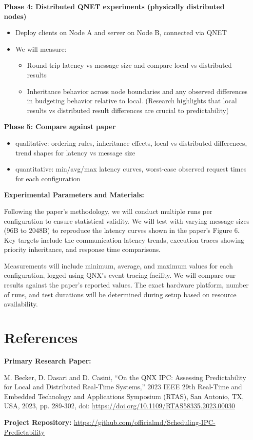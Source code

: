\documentclass[11pt]{article}
\begin{document}
\noindent\textbf{Phase 4: Distributed QNET experiments (physically distributed nodes)}

\begin{itemize}
\item Deploy clients on Node A and server on Node B, connected via QNET
\item We will measure:
\begin{itemize}
\item Round-trip latency vs message size and compare local vs distributed results
\item Inheritance behavior across node boundaries and any observed differences in budgeting behavior relative to local. (Research highlights that local results vs distributed result differences are crucial to predictability)
\end{itemize}
\end{itemize}

\noindent\textbf{Phase 5: Compare against paper}

\begin{itemize}
\item qualitative: ordering rules, inheritance effects, local vs distributed differences, trend shapes for latency vs message size
\item quantitative: min/avg/max latency curves, worst-case observed request times for each configuration
\end{itemize}

\noindent\textbf{Experimental Parameters and Materials:}

Following the paper's methodology, we will conduct multiple runs per configuration to ensure statistical validity. We will test with varying message sizes (96B to 2048B) to reproduce the latency curves shown in the paper's Figure 6. Key targets include the communication latency trends, execution traces showing priority inheritance, and response time comparisons. 

Measurements will include minimum, average, and maximum values for each configuration, logged using QNX's event tracing facility. We will compare our results against the paper's reported values. The exact hardware platform, number of runs, and test durations will be determined during setup based on resource availability.

\section{References}

\noindent\textbf{Primary Research Paper:}

M. Becker, D. Dasari and D. Casini, ``On the QNX IPC: Assessing Predictability for Local and Distributed Real-Time Systems,'' 2023 IEEE 29th Real-Time and Embedded Technology and Applications Symposium (RTAS), San Antonio, TX, USA, 2023, pp. 289-302, doi: \url{https://doi.org/10.1109/RTAS58335.2023.00030}

\vspace{1em}

\noindent\textbf{Project Repository:} \url{https://github.com/officialmd/Scheduling-IPC-Predictability}
\end{document}
